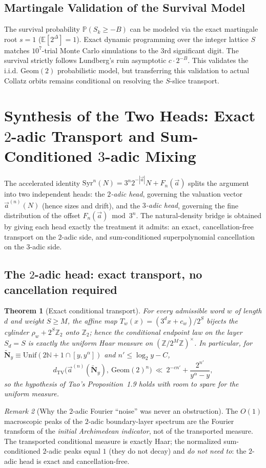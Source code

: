 \documentclass[12pt,a4paper]{article}
\newtheorem{theorem}{Theorem}[section]
\theoremstyle{remark}
\newtheorem{remark}[theorem]{Remark}
\begin{document}
\subsection{Martingale Validation of the Survival Model}
The survival probability $\mathbb{P}(S_k \ge -B)$ can be modeled via the exact martingale root $s=1$ ($\mathbb{E}[2^\Delta] = 1$). Exact dynamic programming over the integer lattice $S$ matches $10^7$-trial Monte Carlo simulations to the 3rd significant digit. The survival strictly follows Lundberg's ruin asymptotic $c \cdot 2^{-B}$. This validates the i.i.d. $\mathrm{Geom}(2)$ probabilistic model, but transferring this validation to actual Collatz orbits remains conditional on resolving the $S$-slice transport.

\section{Synthesis of the Two Heads: Exact $2$-adic Transport and Sum-Conditioned $3$-adic Mixing}
\label{sec:synthesis}
The accelerated identity $\mathrm{Syr}^n(N)=3^n2^{-|\vec a|}N+F_n(\vec a)$ splits the
argument into two independent heads: the \emph{$2$-adic head}, governing the
valuation vector $\vec a^{(n)}(N)$ (hence sizes and drift), and the
\emph{$3$-adic head}, governing the fine distribution of the offset
$F_n(\vec a)\bmod 3^n$. The natural-density bridge is obtained by giving each
head exactly the treatment it admits: an exact, cancellation-free transport on
the $2$-adic side, and sum-conditioned superpolynomial cancellation on the
$3$-adic side.
\subsection{The $2$-adic head: exact transport, no cancellation required}
\begin{theorem}[Exact conditional transport]
For every admissible word $w$ of length $d$ and weight $S\ge M$, the affine map
$T_w(x)=(3^dx+c_w)/2^S$ bijects the cylinder $\rho_w+2^S\mathbb Z_2$ onto
$\mathbb Z_2$; hence the conditional endpoint law on the layer $S_d=S$ is
exactly the uniform Haar measure on $(\mathbb Z/2^M\mathbb Z)^\times$. In
particular, for $\widetilde{\mathbf N}_y\equiv\mathrm{Unif}(2\mathbb N+1\cap[y,y^\alpha])$
and $n'\le\log_2 y-C$,
\[
d_{\mathrm{TV}}\big(\vec a^{(n)}(\widetilde{\mathbf N}_y),\ \mathrm{Geom}(2)^n\big)
\ \ll\ 2^{-cn'}+\frac{2^{n'}}{y^\alpha-y},
\]
so the hypothesis of Tao's Proposition~1.9 holds with room to spare for the
uniform measure.
\end{theorem}
\begin{remark}[Why the $2$-adic Fourier ``noise'' was never an obstruction]
The $O(1)$ macroscopic peaks of the $2$-adic boundary-layer spectrum are the
Fourier transform of the \emph{initial Archimedean indicator}, not of the
transported measure. The transported conditional measure is exactly Haar; the
normalized sum-conditioned $2$-adic peaks equal $1$ (they do not decay) and
\emph{do not need to}: the $2$-adic head is exact and cancellation-free.
\end{remark}
\end{document}
